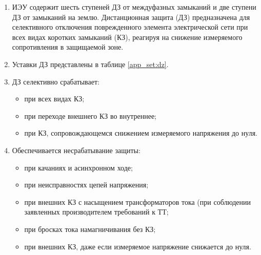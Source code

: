 \color{black}

\begin{enumerate}[label=\arabic{section}.\arabic{subsection}.\arabic*,  align=left, labelsep=4pt, leftmargin=0pt, itemindent=57pt]

\item
ИЭУ содержит шесть ступеней ДЗ от междуфазных замыканий и две ступени ДЗ от замыканий на землю. Дистанционная  защита  (ДЗ)  предназначена  для  селективного  отключения  поврежденного  элемента
электрической сети при всех видах  коротких  замыканий (КЗ),  реагируя  на снижение измеряемого сопротивления в защищаемой зоне.

\item
Уставки ДЗ представлены в таблице \ref{app_set:dz}.

\item 
ДЗ селективно срабатывает:
\begin{itemize}
    \item при всех видах КЗ; 
    \item при переходе внешнего КЗ во внутреннее; 
    \item при КЗ, сопровождающемся снижением измеряемого напряжения до нуля.
\end{itemize}

\item 
Обеспечивается несрабатывание защиты:
\begin{itemize} 
\item при качаниях и асинхронном ходе; 
\item при неисправностях цепей напряжения;
\item при внешних КЗ с насыщением трансформаторов тока (при соблюдении заявленных производителем требований к ТТ; 
\item при бросках тока намагничивания без КЗ;
\item при внешних КЗ, даже если измеряемое напряжение снижается до нуля.
\end{itemize}


\end{enumerate}
